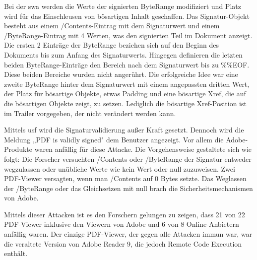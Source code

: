 \par
Bei der \gls{swa} werden die Werte der signierten ByteRange modifiziert und Platz wird für das Einschleusen von bösartigen Inhalt geschaffen. Das Signatur-Objekt besteht aus einem /Contents-Eintrag mit dem Signaturwert und einem /ByteRange-Eintrag mit 4 Werten, was den signierten Teil im Dokument anzeigt. Die ersten 2 Einträge der ByteRange beziehen sich auf den Beginn des Dokuments bis zum Anfang des Signaturwerts. Hingegen definieren die letzten beiden ByteRange-Einträge den Bereich nach dem Signaturwert bis zu \%\%EOF. Diese beiden Bereiche wurden nicht angerührt. Die erfolgreiche Idee war eine zweite ByteRange hinter dem Signaturwert mit einem angepassten dritten Wert, der Platz für bösartige Objekte, etwas Padding und eine bösartige Xref, die auf die bösartigen Objekte zeigt, zu setzen. Lediglich die bösartige Xref-Position ist im Trailer vorgegeben, der nicht verändert werden kann. \cite{ccc-break-pdf}
\par
Mittels \gls{usf} wird die Signaturvalidierung außer Kraft gesetzt. Dennoch wird die Meldung „PDF is validly signed" dem Benutzer angezeigt. Vor allem die Adobe-Produkte waren anfällig für diese Attacke. Die Vorgehensweise gestaltete sich wie folgt: Die Forscher versuchten /Contents oder /ByteRange der Signatur entweder wegzulassen oder unübliche Werte wie kein Wert oder null zuzuweisen. Zwei PDF-Viewer versagten, wenn man /Contents auf 0 Bytes setzte. Das Weglassen der /ByteRange oder das Gleichsetzen mit null brach die Sicherheitsmechanismen von Adobe. \cite{ccc-break-pdf}
\par
Mittels dieser Attacken ist es den Forschern gelungen zu zeigen, dass 21 von 22 PDF-Viewer inklusive den Viewern von Adobe und 6 von 8 Online-Anbietern anfällig waren. Der einzige PDF-Viewer, der gegen alle Attacken immun war, war die veraltete Version von Adobe Reader 9, die jedoch Remote Code Execution enthält. \cite{ccc-break-pdf}